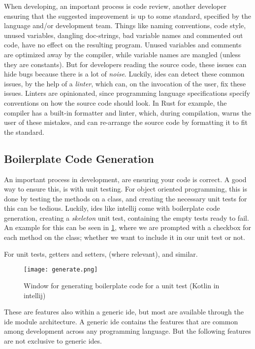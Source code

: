 When developing, an important process is code review, another developer ensuring
that the suggested improvement is up to some standard, specified by the
language and/or development team. Things like naming conventions, code style,
unused variables, dangling doc-strings, bad variable names and commented out
code, have no effect on the resulting program. Unused variables and comments
are optimized away by the compiler, while variable names are mangled (unless
they are constants). But for developers reading the source code, these issues
can hide bugs because there is a lot of \textit{noise}. Luckily, \gls{ide}s can
detect these common issues, by the help of a \textit{linter}, which can, on the
invocation of the user, fix these issues. Linters are opinionated, since
programming language specifications specify conventions on how the source code
should look. In Rust for example, the compiler has a built-in formatter and
linter, which, during compilation, warns the user of these mistakes, and can
re-arrange the source code by formatting it to fit the standard.

\subsection{Boilerplate Code Generation}

An important process in development, are ensuring your code is correct. A good
way to ensure this, is with unit testing. For object oriented programming, this
is done by testing the methods on a class, and creating the necessary unit tests
for this can be tedious. Luckily, \gls{ide}s like \gls{intellij} come with
boilerplate code generation, creating a \textit{skeleton} unit test, containing
the empty tests ready to fail. An example for this can be seen in
\ref{pic:generate}, where we are prompted with a checkbox for each method on
the class; whether we want to include it in our unit test or not.

For unit tests, getters and setters, (where relevant), and similar.

\begin{figure}
  \centering
  \texttt{[image: generate.png]}
  \caption{
    Window for generating boilerplate code for a unit test (Kotlin in
    \gls{intellij})
  }
  \label{pic:generate}
\end{figure}

These are features also within a generic \gls{ide}, but most are available
through the \gls{ide} module architecture. A generic \gls{ide} contains the
features that are common among development across any programming language. But
the following features are not exclusive to generic \gls{ide}s.

